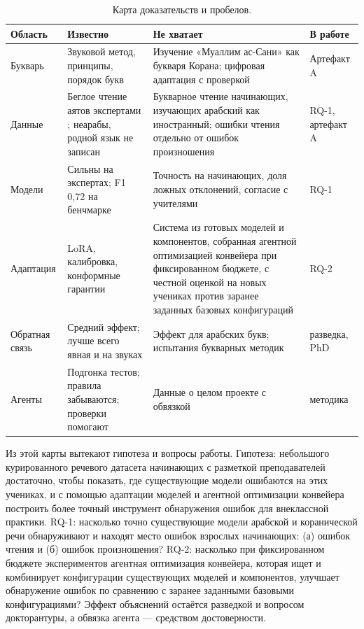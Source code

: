 \documentclass[a4paper,14pt]{extarticle}
\begin{document}
\begin{table}[ht]
\centering\small
\caption{Карта доказательств и пробелов.}
\label{tab:gaps-ru}
\begin{tabularx}{\linewidth}{@{}P{2.6cm}LLP{2.6cm}@{}}
\toprule
Область & Известно & Не хватает & В работе \\
\midrule
Букварь & Звуковой метод, принципы, порядок букв \cite{SRC-015,SRC-016,SRC-017} & Изучение «Муаллим
ас-Сани» как букваря Корана; цифровая адаптация с проверкой & Артефакт A \\
Данные & Беглое чтение аятов экспертами \cite{SRC-004,SRC-043}; неарабы, родной язык не записан \cite{SRC-032} &
Букварное чтение начинающих, изучающих арабский как иностранный; ошибки чтения отдельно от ошибок произношения & RQ-1, артефакт A \\
Модели & Сильны на экспертах; F1 0,72 на бенчмарке \cite{SRC-002,SRC-031} & Точность на начинающих,
доля ложных отклонений, согласие с учителями & RQ-1 \\
Адаптация & LoRA, калибровка, конформные гарантии \cite{SRC-111,SRC-112,SRC-114} & Система из готовых моделей и компонентов, собранная агентной оптимизацией конвейера при фиксированном бюджете, с честной оценкой на новых учениках против заранее заданных базовых конфигураций & RQ-2 \\
Обратная связь & Средний эффект; лучше всего явная и на звуках \cite{SRC-025,SRC-026} & Эффект для
арабских букв; испытания букварных методик & разведка, PhD \\
Агенты & Подгонка тестов; правила забываются; проверки помогают \cite{SRC-027,SRC-076,SRC-078} &
Данные о целом проекте с обвязкой & методика \\
\bottomrule
\end{tabularx}
\end{table}

Из этой карты вытекают гипотеза и вопросы работы. Гипотеза: небольшого курированного речевого датасета начинающих с разметкой преподавателей достаточно, чтобы показать, где существующие модели ошибаются на этих учениках, и с помощью адаптации моделей и агентной оптимизации конвейера построить более точный инструмент обнаружения ошибок для внеклассной практики. RQ-1: насколько точно существующие модели арабской и коранической речи обнаруживают и находят место ошибок взрослых начинающих: (а) ошибок чтения и (б) ошибок произношения? RQ-2: насколько при фиксированном бюджете экспериментов агентная оптимизация конвейера, которая ищет и комбинирует конфигурации существующих моделей и компонентов, улучшает обнаружение ошибок по сравнению с заранее заданными базовыми конфигурациями? Эффект объяснений
остаётся разведкой и вопросом докторантуры, а обвязка агента --- средством достоверности.
\end{document}
